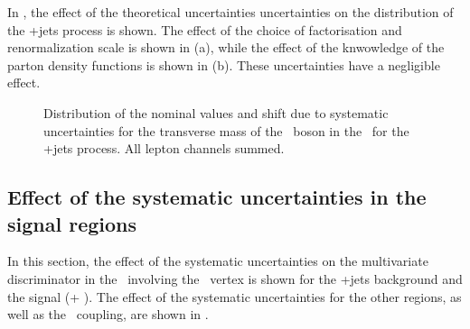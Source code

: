 In , the effect of the theoretical uncertainties uncertainties on the distribution of the \WZ+jets process is shown. The effect of the choice of factorisation and renormalization scale is shown in  (a), while the effect of the knwowledge of the parton density functions is shown in  (b). These uncertainties have a negligible effect. 
\begin{figure}[htbp] 
	\centering 

	\caption{Distribution of the nominal values and shift due to  systematic uncertainties for the transverse mass of the \PW\ boson in the \WZCR\ for the \WZ+jets process. All lepton channels summed.}
	\label{fig:shiftMTWt}
\end{figure}
\newpage
\subsection{Effect of the systematic uncertainties in the signal regions}
\label{sec:BDTsys}
In this section, the effect of the systematic uncertainties on the multivariate discriminator in the \STSR\ involving the \Zut\ vertex is shown for the \WZ+jets background and the signal (\tZ + \tZq). The effect of the systematic uncertainties for the other regions, as well as the \Zct\ coupling, are shown in . 

